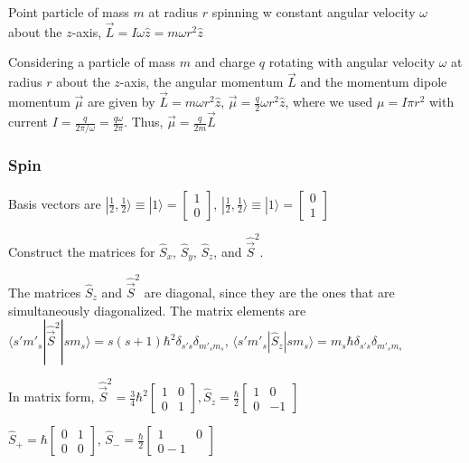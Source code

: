 Point particle of mass $m$ at radius $r$ spinning w constant angular velocity $\omega$ about the $z$-axis, $\vec{L} = I \omega \widehat{z} = m \omega r^2 \widehat{z}$

Considering a particle of mass $m$ and charge $q$ rotating with angular velocity $\omega$ at radius $r$ about the $z$-axis, the angular momentum $\vec{L}$ and the momentum dipole momentum $\vec{\mu}$ are given by $\vec{L} = m \omega r^2 \widehat{z}$, $\vec{\mu} = \frac{q}{2} \omega r^2 \widehat{z}$, where we used $\mu = I \pi r^2$ with current $I = \frac{q}{2 \pi / \omega} = \frac{q \omega}{2 \pi}$. Thus, $\vec{\mu} = \frac{q}{2m} \vec{L}$

\subsubsection{Spin} \hfill

Basis vectors are $| \frac{1}{2}, \frac{1}{2} \rangle \equiv | 1 \rangle = \begin{bmatrix} 1 \\ 0 \end{bmatrix}$, $| \frac{1}{2}, \frac{1}{2} \rangle \equiv | 1 \rangle = \begin{bmatrix} 0 \\ 1 \end{bmatrix}$

Construct the matrices for $\widehat{S}_x$, $\widehat{S}_y$, $\widehat{S}_z$, and $\widehat{\vec{S}}^2$. 

The matrices $\widehat{S}_z$ and $\widehat{\vec{S}}^2$ are diagonal, since they are the ones that are simultaneously diagonalized. The matrix elements are $\langle s' m'_s | \widehat{\vec{S}}^2 | sm_s \rangle = s(s+1) \hbar^2 \delta_{s' s} \delta_{m'_s m_s}$, $\langle s' m'_s | \widehat{S}_z | sm_s \rangle = m_s \hbar \delta_{s' s} \delta_{m'_s m_s}$

In matrix form, $\widehat{\vec{S}}^2 = \frac{3}{4} \hbar^2 \begin{bmatrix} 1 & 0 \\ 0 & 1 \end{bmatrix}, \widehat{S}_z = \frac{\hbar}{2} \begin{bmatrix} 1 & 0 \\ 0 & -1 \end{bmatrix}$

$\widehat{S}_{+} = \hbar \begin{bmatrix} 0 & 1 \\ 0 & 0 \end{bmatrix}$, $\widehat{S}_{-} = \frac{\hbar}{2} \begin{bmatrix} 1 & 0 \\ 0 -1 \end{bmatrix}$

